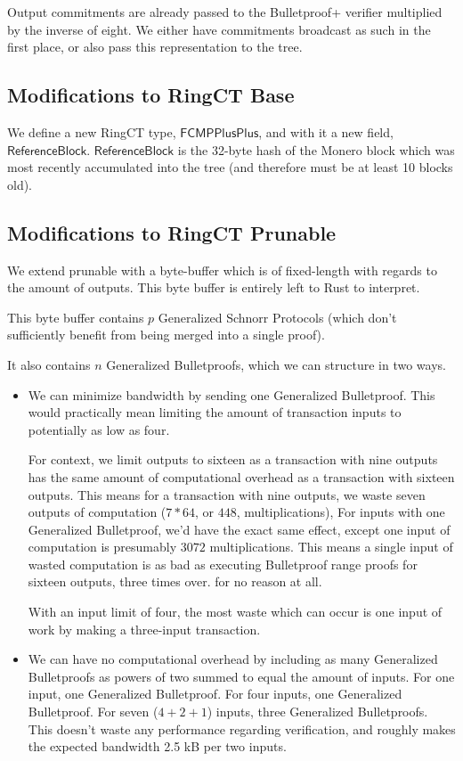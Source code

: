 \documentclass[]{article}
\begin{document}
Output commitments are already passed to the Bulletproof+ verifier multiplied by the inverse of eight. We either have commitments broadcast as such in the first place, or also pass this representation to the tree.

\subsection{Modifications to RingCT Base}

We define a new RingCT type, $\mathsf{FCMPPlusPlus}$, and with it a new field, $\mathsf{ReferenceBlock}$. $\mathsf{ReferenceBlock}$ is the 32-byte hash of the Monero block which was most recently accumulated into the tree (and therefore must be at least 10 blocks old).

\subsection{Modifications to RingCT Prunable}

We extend prunable with a byte-buffer which is of fixed-length with regards to the amount of outputs. This byte buffer is entirely left to Rust to interpret.

This byte buffer contains $p$ Generalized Schnorr Protocols (which don't sufficiently benefit from being merged into a single proof).

It also contains $n$ Generalized Bulletproofs, which we can structure in two ways.

\begin{itemize}
	\item
	We can minimize bandwidth by sending one Generalized Bulletproof. This would practically mean limiting the amount of transaction inputs to potentially as low as four.
	
	For context, we limit outputs to sixteen as a transaction with nine outputs has the same amount of computational overhead as a transaction with sixteen outputs. This means for a transaction with nine outputs, we waste seven outputs of computation ($7 * 64$, or $448$, multiplications), For inputs with one Generalized Bulletproof, we'd have the exact same effect, except one input of computation is presumably $3072$ multiplications. This means a single input of wasted computation is as bad as executing Bulletproof range proofs for sixteen outputs, three times over. for no reason at all.
	
	With an input limit of four, the most waste which can occur is one input of work by making a three-input transaction.
	\item
	We can have no computational overhead by including as many Generalized Bulletproofs as powers of two summed to equal the amount of inputs. For one input, one Generalized Bulletproof. For four inputs, one Generalized Bulletproof. For seven ($4 + 2 + 1$) inputs, three Generalized Bulletproofs. This doesn't waste any performance regarding verification, and roughly makes the expected bandwidth 2.5 kB per two inputs.
\end{itemize}
\end{document}
